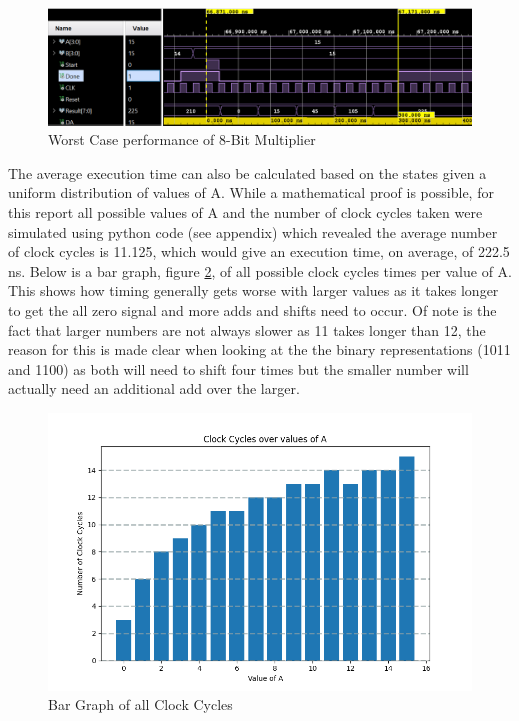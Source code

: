 \documentclass[11pt]{article}
\begin{document}
\begin{figure}[H]        
    \centering
    \includegraphics[width=\textwidth]{8bit_worst.png}
    \caption{Worst Case performance of 8-Bit Multiplier}
    \label{fig:4bit_worstcase}
\end{figure} 

The average execution time can also be calculated based on the states given a uniform distribution of values of A. 
While a mathematical proof is possible, for this report all possible values of A and the number of clock cycles taken were simulated using python code (see appendix)
which revealed the average number of clock cycles is 11.125, which would give an execution time, on average, of 222.5 ns.
Below is a bar graph, figure \ref{fig:bar}, of all possible clock cycles times per value of A.
This shows how timing generally gets worse with larger values as it takes longer to get the all zero signal and more adds and shifts need to occur.
Of note is the fact that larger numbers are not always slower as 11 takes longer than 12, the reason for this is made clear when looking at the the binary representations (1011 and 1100)
as both will need to shift four times but the smaller number will actually need an additional add over the larger.

\begin{figure}[H]        
    \centering
    \includegraphics[width=.75\textwidth]{ClockCycles.png}
    \caption{Bar Graph of all Clock Cycles}
    \label{fig:bar}
\end{figure} 
\end{document}
